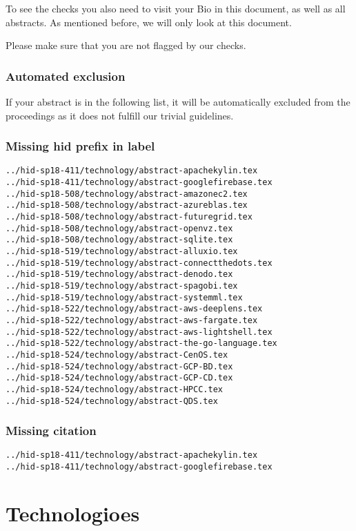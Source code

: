 To see the checks you also need to visit your Bio in this document, as
well as all abstracts. As mentioned before, we will only look at this
document.

Please make sure that you are not flagged by our checks. 

\section{Automated exclusion}

If your abstract is in the following list, it will be automatically
excluded from the proceedings as it does not fulfill our trivial
guidelines.

\section{Missing hid prefix in label}
\begin{verbatim}
../hid-sp18-411/technology/abstract-apachekylin.tex
../hid-sp18-411/technology/abstract-googlefirebase.tex
../hid-sp18-508/technology/abstract-amazonec2.tex
../hid-sp18-508/technology/abstract-azureblas.tex
../hid-sp18-508/technology/abstract-futuregrid.tex
../hid-sp18-508/technology/abstract-openvz.tex
../hid-sp18-508/technology/abstract-sqlite.tex
../hid-sp18-519/technology/abstract-alluxio.tex
../hid-sp18-519/technology/abstract-connectthedots.tex
../hid-sp18-519/technology/abstract-denodo.tex
../hid-sp18-519/technology/abstract-spagobi.tex
../hid-sp18-519/technology/abstract-systemml.tex
../hid-sp18-522/technology/abstract-aws-deeplens.tex
../hid-sp18-522/technology/abstract-aws-fargate.tex
../hid-sp18-522/technology/abstract-aws-lightshell.tex
../hid-sp18-522/technology/abstract-the-go-language.tex
../hid-sp18-524/technology/abstract-CenOS.tex
../hid-sp18-524/technology/abstract-GCP-BD.tex
../hid-sp18-524/technology/abstract-GCP-CD.tex
../hid-sp18-524/technology/abstract-HPCC.tex
../hid-sp18-524/technology/abstract-QDS.tex

\end{verbatim}
\section{Missing citation}
\begin{verbatim}
../hid-sp18-411/technology/abstract-apachekylin.tex
../hid-sp18-411/technology/abstract-googlefirebase.tex

\end{verbatim}
\part{Technologioes}
